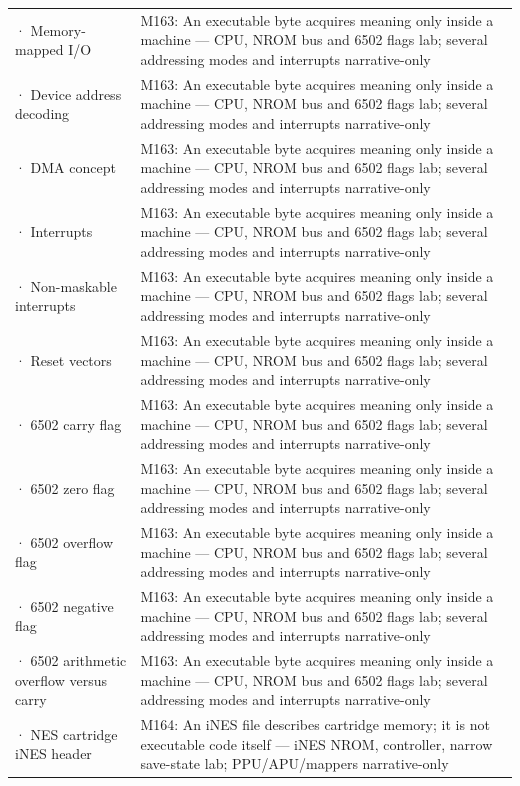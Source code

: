 {\begin{longtable}[]{@{}
  >{\raggedright\arraybackslash}p{}
  >{\raggedright\arraybackslash}p{}@{}}
2718 · Memory-mapped I/O & M163: An executable byte acquires meaning only inside a machine --- CPU, NROM bus and 6502 flags lab; several addressing modes and interrupts narrative-only \\
2719 · Device address decoding & M163: An executable byte acquires meaning only inside a machine --- CPU, NROM bus and 6502 flags lab; several addressing modes and interrupts narrative-only \\
2720 · DMA concept & M163: An executable byte acquires meaning only inside a machine --- CPU, NROM bus and 6502 flags lab; several addressing modes and interrupts narrative-only \\
2721 · Interrupts & M163: An executable byte acquires meaning only inside a machine --- CPU, NROM bus and 6502 flags lab; several addressing modes and interrupts narrative-only \\
2722 · Non-maskable interrupts & M163: An executable byte acquires meaning only inside a machine --- CPU, NROM bus and 6502 flags lab; several addressing modes and interrupts narrative-only \\
2723 · Reset vectors & M163: An executable byte acquires meaning only inside a machine --- CPU, NROM bus and 6502 flags lab; several addressing modes and interrupts narrative-only \\
2724 · 6502 carry flag & M163: An executable byte acquires meaning only inside a machine --- CPU, NROM bus and 6502 flags lab; several addressing modes and interrupts narrative-only \\
2725 · 6502 zero flag & M163: An executable byte acquires meaning only inside a machine --- CPU, NROM bus and 6502 flags lab; several addressing modes and interrupts narrative-only \\
2726 · 6502 overflow flag & M163: An executable byte acquires meaning only inside a machine --- CPU, NROM bus and 6502 flags lab; several addressing modes and interrupts narrative-only \\
2727 · 6502 negative flag & M163: An executable byte acquires meaning only inside a machine --- CPU, NROM bus and 6502 flags lab; several addressing modes and interrupts narrative-only \\
2728 · 6502 arithmetic overflow versus carry & M163: An executable byte acquires meaning only inside a machine --- CPU, NROM bus and 6502 flags lab; several addressing modes and interrupts narrative-only \\
2729 · NES cartridge iNES header & M164: An iNES file describes cartridge memory; it is not executable code itself --- iNES NROM, controller, narrow save-state lab; PPU/APU/mappers narrative-only \\

\end{longtable}}
